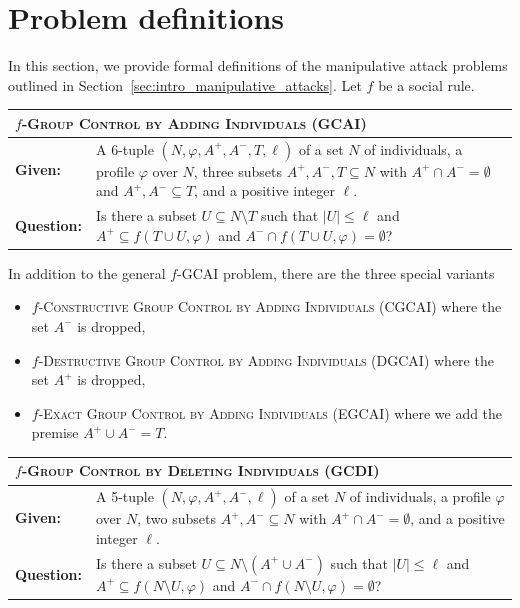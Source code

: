 \documentclass[
    12pt,               %
    a4paper,            %
    bibtotoc,           %
    pointlessnumbers,   %
    ngerman,            %
    titlepage,          %
    leqno,              %
    ]{scrarticle}       %
\newcommand\secref{Section~\ref}
\begin{document}
\clearpage

\section{Problem definitions}
\label{sec:problem_definitions}

In this section, we provide formal definitions of the manipulative attack problems outlined in \secref{sec:intro_manipulative_attacks}. Let $f$ be a social rule.

\bigskip

\begin{tabularx}{\textwidth}{lX}
\hline
\multicolumn{2}{l}{
$f$-\textsc{Group Control by Adding Individuals} (GCAI)
} \\
\hline
\textbf{Given:} &
A 6-tuple $(N, \varphi, A^+, A^-, T, \ell)$ of a set $N$ of individuals, a profile $\varphi$ over $N$, three subsets $A^+, A^-, T \subseteq N$ with $A^+ \cap A^- = \emptyset$ and $A^+, A^- \subseteq T$, and a positive integer $\ell$. \\
\textbf{Question:} &
Is there a subset $U \subseteq N \setminus T$ such that $|U| \leq \ell$ and $A^+ \subseteq f(T \cup U, \varphi)$ and $A^- \cap f(T \cup U, \varphi) = \emptyset$? \\
\hline
\end{tabularx}



In addition to the general $f$-GCAI problem, there are the three special variants
\begin{itemize}
\item
$f$-\textsc{Constructive Group Control by Adding Individuals} (CGCAI) where the set $A^-$ is dropped,
\item
$f$-\textsc{Destructive Group Control by Adding Individuals} (DGCAI) where the set $A^+$ is dropped,
\item
$f$-\textsc{Exact Group Control by Adding Individuals} (EGCAI) where we add the premise $A^+ \cup A^- = T$.
\end{itemize}



\bigskip

\begin{tabularx}{\textwidth}{lX}
\hline
\multicolumn{2}{l}{
$f$-\textsc{Group Control by Deleting Individuals} (GCDI)
} \\
\hline
\textbf{Given:} &
A 5-tuple $(N, \varphi, A^+, A^-, \ell)$ of a set $N$ of individuals, a profile $\varphi$ over $N$, two subsets $A^+, A^- \subseteq N$ with $A^+ \cap A^- = \emptyset$, and a positive integer $\ell$. \\
\textbf{Question:} &
Is there a subset $U \subseteq N \setminus (A^+ \cup A^-)$ such that $|U| \leq \ell$ and $A^+ \subseteq f(N \setminus U, \varphi)$ and $A^- \cap f(N \setminus U, \varphi) = \emptyset$? \\
\hline
\end{tabularx}
\end{document}
